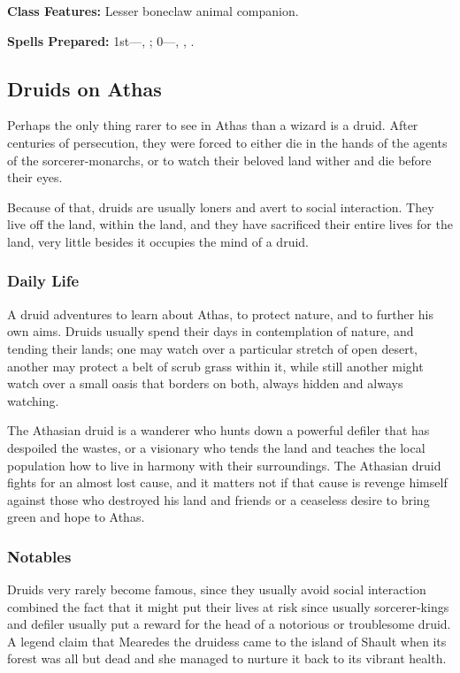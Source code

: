 \textbf{Class Features:} Lesser boneclaw animal companion.

\textbf{Spells Prepared:} 1st---, ; 0---, , .


\subsection{Druids on Athas}

Perhaps the only thing rarer to see in Athas than a wizard is a druid. After centuries of persecution, they were forced to either die in the hands of the agents of the sorcerer-monarchs, or to watch their beloved land wither and die before their eyes.

Because of that, druids are usually loners and avert to social interaction. They live off the land, within the land, and they have sacrificed their entire lives for the land, very little besides it occupies the mind of a druid.

\subsubsection{Daily Life}
A druid adventures to learn about Athas, to protect nature, and to further his own aims. Druids usually spend their days in contemplation of nature, and tending their lands; one may watch over a particular stretch of open desert, another may protect a belt of scrub grass within it, while still another might watch over a small oasis that borders on both, always hidden and always watching.

The Athasian druid is a wanderer who hunts down a powerful defiler that has despoiled the wastes, or a visionary who tends the land and teaches the local population how to live in harmony with their surroundings. The Athasian druid fights for an almost lost cause, and it matters not if that cause is revenge himself against those who destroyed his land and friends or a ceaseless desire to bring green and hope to Athas.

\subsubsection{Notables}
Druids very rarely become famous, since they usually avoid social interaction combined the fact that it might put their lives at risk since usually sorcerer-kings and defiler usually put a reward for the head of a notorious or troublesome druid. A legend claim that Mearedes the druidess came to the island of Shault when its forest was all but dead and she managed to nurture it back to its vibrant health.

